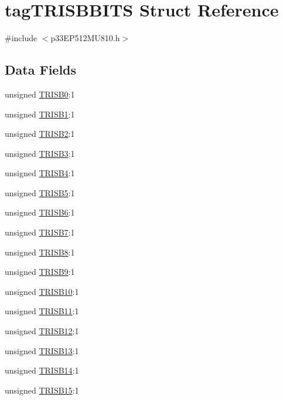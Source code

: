 \hypertarget{structtag_t_r_i_s_b_b_i_t_s}{}\section{tag\+T\+R\+I\+S\+B\+B\+I\+TS Struct Reference}
\label{structtag_t_r_i_s_b_b_i_t_s}


{\ttfamily \#include $<$p33\+E\+P512\+M\+U810.\+h$>$}

\subsection*{Data Fields}
\begin{DoxyCompactItemize}
\item 
unsigned \hyperlink{structtag_t_r_i_s_b_b_i_t_s_a8c0a76a0dcde6d2328e831a289d6b087}{T\+R\+I\+S\+B0}\+:1
\item 
unsigned \hyperlink{structtag_t_r_i_s_b_b_i_t_s_a7db469569b510c735b7288bb4312c196}{T\+R\+I\+S\+B1}\+:1
\item 
unsigned \hyperlink{structtag_t_r_i_s_b_b_i_t_s_a6a9b5e42d2b7941caf83bfa1902dd9e9}{T\+R\+I\+S\+B2}\+:1
\item 
unsigned \hyperlink{structtag_t_r_i_s_b_b_i_t_s_afbf0db86e11d2b62309c7146bbf50a99}{T\+R\+I\+S\+B3}\+:1
\item 
unsigned \hyperlink{structtag_t_r_i_s_b_b_i_t_s_a3f9c4d0e1d77320b4ff08108cf8d7f82}{T\+R\+I\+S\+B4}\+:1
\item 
unsigned \hyperlink{structtag_t_r_i_s_b_b_i_t_s_a0d22aab025d01d88618a37bf366cd48d}{T\+R\+I\+S\+B5}\+:1
\item 
unsigned \hyperlink{structtag_t_r_i_s_b_b_i_t_s_ad0ca870291a16d4f8ebaca4230d42789}{T\+R\+I\+S\+B6}\+:1
\item 
unsigned \hyperlink{structtag_t_r_i_s_b_b_i_t_s_a9e73d3d0bb9a6ad9d46f2d162afc873d}{T\+R\+I\+S\+B7}\+:1
\item 
unsigned \hyperlink{structtag_t_r_i_s_b_b_i_t_s_a5f2fd75ee958ad7ba6d23b534b702412}{T\+R\+I\+S\+B8}\+:1
\item 
unsigned \hyperlink{structtag_t_r_i_s_b_b_i_t_s_aefa44ddbe56cf2aeba4e213ce02da413}{T\+R\+I\+S\+B9}\+:1
\item 
unsigned \hyperlink{structtag_t_r_i_s_b_b_i_t_s_a2acb0482a3bfd1840b55d160c5785883}{T\+R\+I\+S\+B10}\+:1
\item 
unsigned \hyperlink{structtag_t_r_i_s_b_b_i_t_s_a0d9382894f52e1e6eacbb2cc0639164a}{T\+R\+I\+S\+B11}\+:1
\item 
unsigned \hyperlink{structtag_t_r_i_s_b_b_i_t_s_af3ca83ef1f73062ec8cb4384d20dd901}{T\+R\+I\+S\+B12}\+:1
\item 
unsigned \hyperlink{structtag_t_r_i_s_b_b_i_t_s_aa36846532c973dffaf7d15654ef875f6}{T\+R\+I\+S\+B13}\+:1
\item 
unsigned \hyperlink{structtag_t_r_i_s_b_b_i_t_s_a745d1bd1b250bb7bf34f40154d7db36d}{T\+R\+I\+S\+B14}\+:1
\item 
unsigned \hyperlink{structtag_t_r_i_s_b_b_i_t_s_a62ca6fc44249efa7f2c94bfae6abe27c}{T\+R\+I\+S\+B15}\+:1
\end{DoxyCompactItemize}


